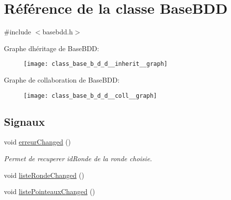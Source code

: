 \hypertarget{class_base_b_d_d}{}\section{Référence de la classe Base\+B\+DD}
\label{class_base_b_d_d}


{\ttfamily \#include $<$basebdd.\+h$>$}



Graphe d\textquotesingle{}héritage de Base\+B\+DD\+:
\nopagebreak
\begin{figure}[H]
\begin{center}
\leavevmode
\texttt{[image: class\_base\_b\_d\_d\_\_inherit\_\_graph]}
\end{center}
\end{figure}


Graphe de collaboration de Base\+B\+DD\+:
\nopagebreak
\begin{figure}[H]
\begin{center}
\leavevmode
\texttt{[image: class\_base\_b\_d\_d\_\_coll\_\_graph]}
\end{center}
\end{figure}
\subsection*{Signaux}
\begin{DoxyCompactItemize}
\item 
void \hyperlink{class_base_b_d_d_af25fa79519e164584eea311acafd51e7}{erreur\+Changed} ()
\begin{DoxyCompactList}\small\item\em Permet de recuperer id\+Ronde de la ronde choisie. \end{DoxyCompactList}\item 
void \hyperlink{class_base_b_d_d_a0e86919a03af0f469f351ea215f76340}{liste\+Ronde\+Changed} ()
\item 
void \hyperlink{class_base_b_d_d_aef78a59308e7f9ee23dfb62e7664d57a}{liste\+Pointeaux\+Changed} ()
\end{DoxyCompactItemize}

